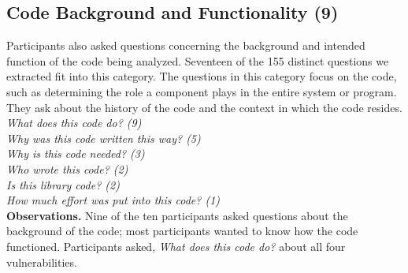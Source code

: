 \documentclass[conference]{IEEEtran}
\begin{document}




\noindent\subsection{\textbf{Code Background and Functionality (9)}}
\label{cbf}
Participants also asked questions concerning the background and intended function of the code being analyzed. 
Seventeen of the 155 distinct questions we extracted fit into this category. 
The questions in this category focus on the code, such as determining the role a component plays in the entire system or program.
They ask about the history of the code and the context in which the code resides.
\\

\noindent\emph{What does this code do? (9)} \\
\emph{Why was this code written this way? (5)} \\
\emph{Why is this code needed? (3)} \\
\emph{Who wrote this code? (2)} \\
\emph{Is this library code? (2)} \\
\emph{How much effort was put into this code? (1)} \\



\noindent\textbf{Observations.}
Nine of the ten participants asked questions about the background of the code; most participants wanted to know how the code functioned.
Participants asked, \textit{What does this code do?} about all four vulnerabilities.
\end{document}
